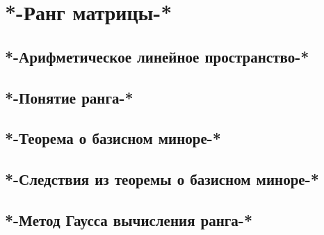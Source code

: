 \chapter{*-Ранг матрицы-*}
\section{*-Арифметическое линейное пространство-*}
\section{*-Понятие ранга-*}
\section{*-Теорема о базисном миноре-*}
\section{*-Следствия из теоремы о базисном миноре-*}
\section{*-Метод Гаусса вычисления ранга-*}

